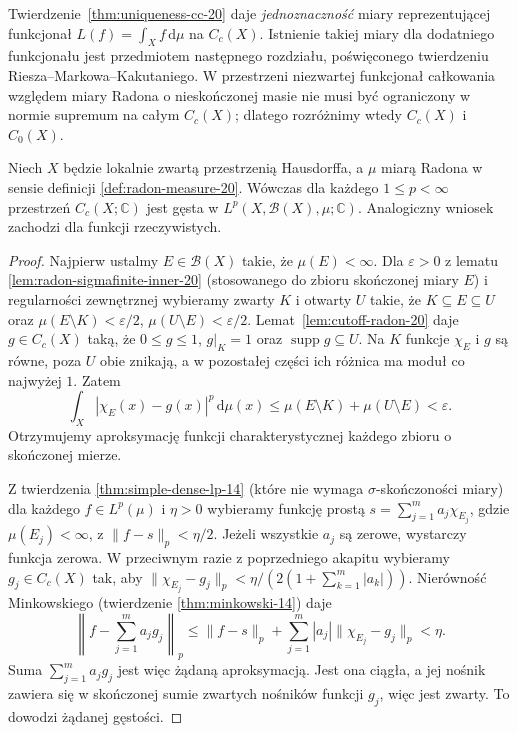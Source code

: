 \begin{uwaga}
Twierdzenie~\ref{thm:uniqueness-cc-20} daje
\emph{jednoznaczność} miary reprezentującej funkcjonał
$L(f)=\int_Xf\,\mathrm d\mu$ na $C_c(X)$.
Istnienie takiej miary dla dodatniego funkcjonału
jest przedmiotem następnego rozdziału, poświęconego
twierdzeniu Riesza--Markowa--Kakutaniego. W przestrzeni
niezwartej funkcjonał całkowania względem miary
Radona o nieskończonej masie nie musi być ograniczony
w normie supremum na całym $C_c(X)$; dlatego rozróżnimy
wtedy $C_c(X)$ i $C_0(X)$.
\end{uwaga}

\begin{twierdzenie}
\label{thm:cc-dense-lp-radon-20}
Niech $X$ będzie lokalnie zwartą przestrzenią Hausdorffa,
a $\mu$ miarą Radona w sensie definicji
\ref{def:radon-measure-20}. Wówczas dla każdego
$1\le p<\infty$ przestrzeń $C_c(X;\mathbb C)$ jest
gęsta w $L^p(X,\mathcal B(X),\mu;\mathbb C)$.
Analogiczny wniosek zachodzi dla funkcji rzeczywistych.
\end{twierdzenie}
\begin{proof}
Najpierw ustalmy $E\in\mathcal B(X)$ takie, że
$\mu(E)<\infty$. Dla $\varepsilon>0$ z lematu \ref{lem:radon-sigmafinite-inner-20}
(stosowanego do zbioru skończonej miary $E$) i regularności
zewnętrznej wybieramy zwarty $K$
i otwarty $U$ takie, że
$K\subseteq E\subseteq U$ oraz
$\mu(E\setminus K)<\varepsilon/2$,
$\mu(U\setminus E)<\varepsilon/2$.
Lemat~\ref{lem:cutoff-radon-20} daje $g\in C_c(X)$
taką, że $0\le g\le1$, $g|_K=1$ oraz
$\operatorname{supp}g\subseteq U$.
Na $K$ funkcje $\chi_E$ i $g$ są równe, poza $U$
obie znikają, a w pozostałej części ich różnica
ma moduł co najwyżej $1$. Zatem
\[
 \int_X|\chi_E(x)-g(x)|^p\,\mathrm d\mu(x)
 \le\mu(E\setminus K)+\mu(U\setminus E)
 <\varepsilon.
\]
Otrzymujemy aproksymację funkcji charakterystycznej
każdego zbioru o skończonej mierze.

Z twierdzenia \ref{thm:simple-dense-lp-14} (które nie
wymaga $\sigma$-skończoności miary) dla każdego $f\in L^p(\mu)$
i $\eta>0$ wybieramy funkcję prostą
$s=\sum_{j=1}^m a_j\chi_{E_j}$, gdzie $\mu(E_j)<\infty$,
z $\|f-s\|_p<\eta/2$. Jeżeli wszystkie $a_j$ są zerowe,
wystarczy funkcja zerowa. W przeciwnym razie z poprzedniego
akapitu wybieramy $g_j\in C_c(X)$ tak, aby
$\|\chi_{E_j}-g_j\|_p<\eta/(2(1+\sum_{k=1}^m|a_k|))$.
Nierówność Minkowskiego (twierdzenie \ref{thm:minkowski-14}) daje
\[
 \left\|f-\sum_{j=1}^m a_jg_j\right\|_p
 \le \|f-s\|_p+\sum_{j=1}^m|a_j|\|\chi_{E_j}-g_j\|_p
 <\eta.
\]
Suma $\sum_{j=1}^m a_jg_j$ jest więc żądaną aproksymacją. Jest ona ciągła, a jej nośnik zawiera się w skończonej sumie
zwartych nośników funkcji $g_j$, więc jest zwarty.
To dowodzi żądanej gęstości.
\end{proof}

